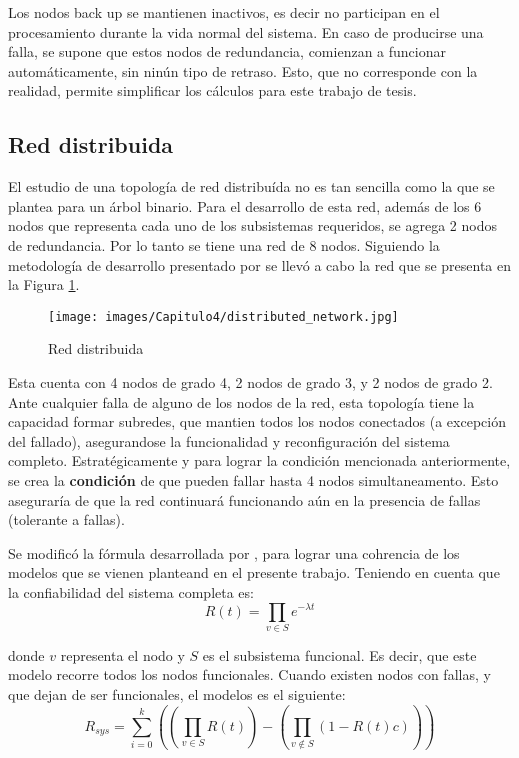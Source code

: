 Los nodos back up se mantienen inactivos, es decir no participan en el procesamiento durante la vida normal del sistema. En caso de producirse una falla, se supone que estos nodos de redundancia, comienzan a funcionar automáticamente, sin ninún tipo de retraso. Esto, que no corresponde con la realidad, permite simplificar los cálculos para este trabajo de tesis.

\subsection{Red distribuida}
El estudio de una topología de red distribuída no es tan sencilla como la que se plantea para un árbol binario. Para el desarrollo de esta red, además de los 6 nodos que representa cada uno de los subsistemas requeridos, se agrega 2 nodos de redundancia. Por lo tanto se tiene una red de 8 nodos. Siguiendo la metodología de desarrollo presentado por \cite{Pradhan82} se llevó a cabo la red que se presenta en la Figura \ref{fig:distributed_net}.

\begin{figure}[h]
 \centering
 \texttt{[image: images/Capitulo4/distributed\_network.jpg]}
  \caption{Red distribuida}
\label{fig:distributed_net}
\end{figure}

Esta cuenta con 4 nodos de grado 4, 2 nodos de grado 3, y 2 nodos de grado 2. Ante cualquier falla de alguno de los nodos de la red, esta topología tiene la capacidad formar subredes, que mantien todos los nodos conectados (a excepción del fallado), asegurandose la funcionalidad y reconfiguración del sistema completo. Estratégicamente y para lograr la condición mencionada anteriormente, se crea la \textbf{condición} de que pueden fallar hasta 4 nodos simultaneamento. Esto aseguraría de que la red continuará funcionando aún en la presencia de fallas (tolerante a fallas).

Se modificó la fórmula desarrollada  por \cite{Stivaros92}, para lograr una cohrencia de los modelos que se vienen planteand en el presente trabajo. Teniendo en cuenta que la confiabilidad del sistema completa es: $$R(t) = \prod_{v \in S} e^{- \lambda t}$$

donde $v$ representa el nodo y $S$ es el subsistema funcional. Es decir, que este modelo recorre todos los nodos funcionales. Cuando existen nodos con fallas, y que dejan de ser funcionales, el modelos es el siguiente: $$R_{sys} =\sum_{i=0}^{k} (( \prod_{v \in S} R(t)) - (\prod_{v \notin S} (1 -  R(t) c )))$$

